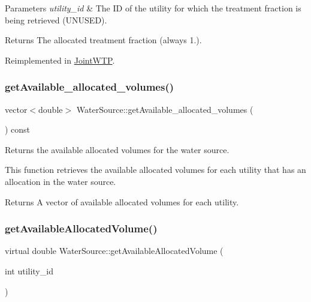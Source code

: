 \begin{DoxyParams}{Parameters}
{\em utility\+\_\+id} & The ID of the utility for which the treatment fraction is being retrieved (U\+N\+U\+S\+ED).\\
\hline
\end{DoxyParams}
\begin{DoxyReturn}{Returns}
The allocated treatment fraction (always 1.). 
\end{DoxyReturn}


Reimplemented in \mbox{\hyperlink{classJointWTP_a3c661704dec4c92b8c16f28e39ca533e}{Joint\+W\+TP}}.

\mbox{\label{classWaterSource_a9a87dafd08834147bcf5004bc3907824}} 
\subsubsection{\texorpdfstring{get\+Available\+\_\+allocated\+\_\+volumes()}{getAvailable\_allocated\_volumes()}}
{\footnotesize\ttfamily vector$<$double$>$ Water\+Source\+::get\+Available\+\_\+allocated\+\_\+volumes (\begin{DoxyParamCaption}{ }\end{DoxyParamCaption}) const}



Returns the available allocated volumes for the water source. 

This function retrieves the available allocated volumes for each utility that has an allocation in the water source.

\begin{DoxyReturn}{Returns}
A vector of available allocated volumes for each utility. 
\end{DoxyReturn}
\mbox{\label{classWaterSource_ad4667296dc6b6dabc36b871529ca2749}} 
\subsubsection{\texorpdfstring{get\+Available\+Allocated\+Volume()}{getAvailableAllocatedVolume()}}
{\footnotesize\ttfamily virtual double Water\+Source\+::get\+Available\+Allocated\+Volume (\begin{DoxyParamCaption}\item[{int}]{utility\+\_\+id }\end{DoxyParamCaption})\hspace{0.3cm}{\ttfamily [virtual]}}



